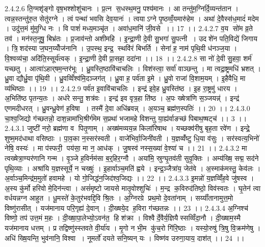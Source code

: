 2.4.2.6
ति॒ग्मशृ॑ङ्गो वृष॒भश्शोशु॑चानः । प्र॒त्न स॒धस्थ॒मनु॒ पश्य॑मानः । आ तन्तु॑म॒ग्निर्दि॒व्यन्त॑तान । त्वन्न॒स्तन्तु॑रु॒त सेतु॑रग्ने । त्वं पन्था॑ भवसि देव॒यानः॑ । त्वयाऽग्ने पृ॒ष्ठव्वँ॒यमारु॑हेम । अथा॑ दे॒वैस्स॑ध॒मादं॑ मदेम । उदु॑त्त॒मं मु॑मुग्धि नः । वि पाशं॑ मध्य॒मञ्चृ॑त । अवा॑ध॒मानि॑ जी॒वसे ।। 17 ।।
2.4.2.7
व॒य सो॑म व्र॒ते तव॑ । मन॑स्त॒नूषु॒ बिभ्र॑तः । प्र॒जाव॑न्तो अशीमहि । इ॒न्द्रा॒णी दे॒वी सु॒भगा॑ सु॒पत्नी । उदशे॑न पति॒विद्ये॑ जिगाय । त्रि॒॒शद॑स्या ज॒घन॒य्योँज॑नानि । उ॒पस्थ॒ इन्द्र॒॒ स्थवि॑रं बिभर्ति । सेना॑ ह॒ नाम॑ पृथि॒वी ध॑नञ्ज॒या । वि॒श्वव्य॑चा॒ अदि॑ति॒स्सूर्य॑त्वक् । इ॒न्द्रा॒णी दे॒वी प्रा॒सहा॒ ददा॑ना ।। 18 ।।
2.4.2.8
सा नो॑ दे॒वी सु॒हवा॒ शर्म॑ यच्छतु । आत्वा॑ऽहार्‌षम॒न्तर॑भूः । ध्रु॒वस्ति॒ष्ठावि॑चाचलिः । विश॑स्त्वा॒ सर्वा॑ वाञ्छन्तु । मा त्वद्रा॒ष्ट्रमधि॑ भ्रशत् । ध्रु॒वा द्यौर्ध्रु॒वा पृ॑थि॒वी । ध्रु॒वव्विँश्व॑मि॒दञ्जग॑त् । ध्रु॒वा ह॒ पर्व॑ता इ॒मे । ध्रु॒वो राजा॑ वि॒शाम॒यम् । इ॒हैवैधि॒ मा व्य॑थिष्ठाः ।। 19 ।।
2.4.2.9
पर्व॑त इ॒वावि॑चाचलिः । इन्द्र॑ इवे॒ह ध्रु॒वस्ति॑ष्ठ । इ॒ह रा॒ष्ट्रमु॑ धारय । अ॒भिति॑ष्ठ पृतन्य॒तः । अध॑रे सन्तु॒ शत्र॑वः । इन्द्र॑ इव वृत्र॒हा ति॑ष्ठ । अ॒पः ख्षेत्रा॑णि स॒ञ्जयन्न्॑ । इन्द्र॑ एणमदीधरत् । ध्रु॒वन्ध्रु॒वेण॑ ह॒विषा । तस्मै॑ दे॒वा अधि॑ब्रवन्न् । अ॒यञ्च॒ ब्रह्म॑ण॒स्पतिः॑ ।। 20 ।।
2.4.3.0
चा॒श्व॒जिद्यो ग॑च्छतन्नो॒ दाश॒न्नामा॑भि॒श्रीर्ग॑मेम स॒प्रथा॑ भजामहे विशन्तु या॒ह्य॑र्वाङच्छ॑ पिबाथ॒ष्षट्च॑ ।। 3 ।।
2.4.3.1
जुष्टी॑ नरो॒ ब्रह्म॑णा व पितृ॒णाम् । अख्ष॑मव्यय॒न्न किला॑रिषाथ । यच्छक्व॑रीषु बृह॒ता रवे॑ण । इन्द्रे॒ शुष्म॒मद॑धाथा वसिष्ठाः । पा॒व॒का न॒स्सर॑स्वती । वाजे॑भिर्वा॒जिनी॑वती । य॒ज्ञव्वँ॑ष्टु धि॒या व॑सुः । सर॑स्वत्य॒भिनो॑ नेषि॒ वस्यः॑ । मा प॑स्फरी॒ पय॑सा॒ मा न॒ आध॑क् । जु॒षस्व॑ नस्स॒ख्या॑ वे॒श्या॑ च ।। 21 ।।
2.4.3.2
मा त्वख्षेत्रा॒ण्यर॑णानि गन्म । वृ॒ञ्जे ह॒विर्नम॑सा ब॒र्॒हिर॒ग्नौ । अया॑मि॒ स्रुग्घृ॒तव॑ती सुवृ॒क्तिः । अम्य॑ख्षि॒ सद्म॒ सद॑ने पृथि॒व्याः । अश्रा॑यि य॒ज्ञस्सूर्ये॒ न चख्षुः॑ । इ॒हार्वाञ्च॒मति॑ ह्वये । इन्द्र॒ञ्जैत्रा॑य॒ जेत॑वे । अ॒स्माक॑मस्तु॒ केव॑लः । अ॒र्वाञ्च॒मिन्द्र॑म॒मुतो॑ हवामहे । यो गो॒जिद्ध॑न॒जिद॑श्व॒जिद्यः ।। 22 ।।
2.4.3.3
इ॒मन्नो॑ य॒ज्ञव्विँ॑ह॒वे जु॑षस्व । अ॒स्य कु॑र्मो हरिवो मे॒दिन॑न्त्वा । असं॑मृष्टो जायसे मातृ॒वोश्शुचिः॑ । म॒न्द्र क॒विरुद॑तिष्ठो॒ विव॑स्वतः । घृ॒तेन॑ त्वा वर्धयन्नग्न आहुत । धू॒मस्ते॑ के॒तुर॑भवद्दि॒वि श्रि॒तः । अ॒ग्निरग्रे प्रथ॒मो दे॒वता॑नाम् । सय्याँ॑तानामुत्त॒मो विष्णु॑रासीत् । यज॑मानाय परि॒गृह्य॑ दे॒वान् । दी॒ख्षये॒द ह॒विरा ग॑च्छतन्नः ।। 23 ।।
2.4.3.4
अ॒ग्निश्च॑ विष्णो॒ तप॑ उत्त॒मं म॒हः । दी॒ख्षा॒पा॒लेभ्यो॒ऽवन॑त॒॒ हि श॑क्रा । विश्वैर्दे॒वैर्य॒ज्ञियैस्सव्विँदा॒नौ । दी॒ख्षाम॒स्मै यज॑मानाय धत्तम् । प्र तद्विष्णु॑स्स्तवते वी॒र्या॑य । मृ॒गो न भी॒म कु॑च॒रो गि॑रि॒ष्ठाः । यस्यो॒रुषु॑ त्रि॒षु वि॒क्रम॑णेषु । अधि॑ ख्षि॒यन्ति॒ भुव॑नानि॒ विश्वा । नूमर्तो॑ दयते सनि॒ष्यन् यः । विष्ण॑व उरुगा॒याय॒ दाश॑त् ।। 24 ।।
